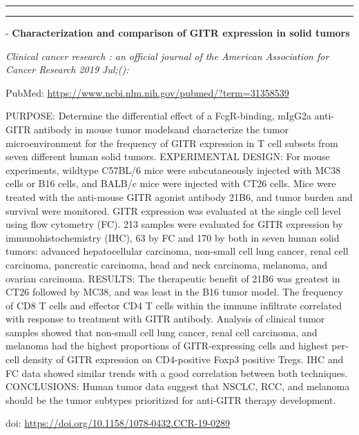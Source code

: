 \documentclass[]{article}
\begin{document}
{}

{}

\begin{center}\rule{0.5\linewidth}{\linethickness}\end{center}

\begin{center}\rule{0.5\linewidth}{\linethickness}\end{center}

 - \textbf{Characterization and comparison of GITR expression in solid
tumors}

\emph{Clinical cancer research : an official journal of the American
Association for Cancer Research 2019 Jul;():}

PubMed: \url{https://www.ncbi.nlm.nih.gov/pubmed/?term=31358539}

PURPOSE: Determine the differential effect of a FcgR-binding, mIgG2a
anti-GITR antibody in mouse tumor modelsand characterize the tumor
microenvironment for the frequency of GITR expression in T cell subsets
from seven different human solid tumors. EXPERIMENTAL DESIGN: For mouse
experiments, wildtype C57BL/6 mice were subcutaneously injected with
MC38 cells or B16 cells, and BALB/c mice were injected with CT26 cells.
Mice were treated with the anti-mouse GITR agonist antibody 21B6, and
tumor burden and survival were monitored. GITR expression was evaluated
at the single cell level using flow cytometry (FC). 213 samples were
evaluated for GITR expression by immunohistochemistry (IHC), 63 by FC
and 170 by both in seven human solid tumors: advanced hepatocellular
carcinoma, non-small cell lung cancer, renal cell carcinoma, pancreatic
carcinoma, head and neck carcinoma, melanoma, and ovarian carcinoma.
RESULTS: The therapeutic benefit of 21B6 was greatest in CT26 followed
by MC38, and was least in the B16 tumor model. The frequency of CD8 T
cells and effector CD4 T cells within the immune infiltrate correlated
with response to treatment with GITR antibody. Analysis of clinical
tumor samples showed that non-small cell lung cancer, renal cell
carcinoma, and melanoma had the highest proportions of GITR-expressing
cells and highest per-cell density of GITR expression on CD4-positive
Foxp3 positive Tregs. IHC and FC data showed similar trends with a good
correlation between both techniques. CONCLUSIONS: Human tumor data
suggest that NSCLC, RCC, and melanoma should be the tumor subtypes
prioritized for anti-GITR therapy development.

doi: \url{https://doi.org/10.1158/1078-0432.CCR-19-0289}
\end{document}
